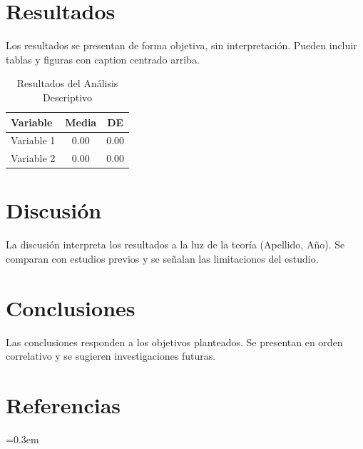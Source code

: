\documentclass[12pt, a4paper, oneside]{article}
\begin{document}
\section*{Resultados}
Los resultados se presentan de forma objetiva, sin interpretación.
Pueden incluir tablas y figuras con caption centrado arriba.

\begin{table}[htbp]
\centering
\caption{Resultados del Análisis Descriptivo}
\begin{tabular}{lcc}
\toprule
Variable & Media & DE \\
\midrule
Variable 1 & 0.00 & 0.00 \\
Variable 2 & 0.00 & 0.00 \\
\bottomrule
\end{tabular}
\end{table}

\section*{Discusión}
La discusión interpreta los resultados a la luz de la teoría
(Apellido, Año). Se comparan con estudios previos y se señalan
las limitaciones del estudio.

\section*{Conclusiones}
Las conclusiones responden a los objetivos planteados. Se presentan
en orden correlativo y se sugieren investigaciones futuras.

\newpage
\singlespacing
\section*{Referencias}
\parindent=-0.5in
\parskip=0in
\parskip=0.3em
\end{document}
